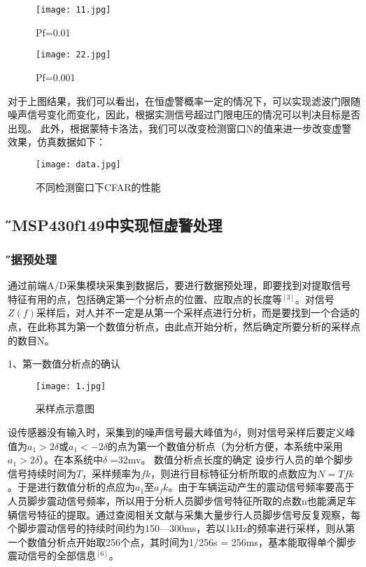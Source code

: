 \documentclass[12pt,a4paper]{article} %
\begin{document}
		
		
		\begin{figure}[h]
\begin{minipage}[bp]{0.5\linewidth}
\centering
\texttt{[image: 11.jpg]}
\caption{Pf=0.01}
\label{fig:side:a}
\end{minipage}
\begin{minipage}[bp]{0.5\linewidth}
\centering
\texttt{[image: 22.jpg]}
\caption{Pf=0.001}
\label{fig:side:b}
\end{minipage}
\end{figure}
  	
  	对于上图结果，我们可以看出，在恒虚警概率一定的情况下，可以实现滤波门限随噪声信号变化而变化，因此，根据实测信号超过门限电压的情况可以判决目标是否出现。
  	此外，根据蒙特卡洛法，我们可以改变检测窗口N的值来进一步改变虚警效果，仿真数据如下：
  	\begin{figure}[h] %
  	 \caption{不同检测窗口下CFAR的性能}
 		  \centering
 		  \texttt{[image: data.jpg]} 
  		 \label{fig:1.1.1}
		\end{figure}
  	
  	\subsection{\H 在MSP430f149中实现恒虚警处理 }
  		\subsubsection{\H 数据预处理 }
  		通过前端A/D采集模块采集到数据后，要进行数据预处理，即要找到对提取信号特征有用的点，包括确定第一个分析点的位置、应取点的长度等$^{[3]}$。对信号$Z(f)$采样后，对人并不一定是从第一个采样点进行分析，而是要找到一个合适的点，在此称其为第一个数值分析点，由此点开始分析，然后确定所要分析的采样点的数目N。
\par 1、第一数值分析点的确认
\begin{figure}[h] %
 		  \centering
 		  \texttt{[image: 1.jpg]} 
  		  \caption{采样点示意图}
  		 \label{fig:1.1.1}
		\end{figure}

  	设传感器没有输入时，采集到的噪声信号最大峰值为$\delta $，则对信号采样后要定义峰值为$a_1>2\delta $或$a_1<-2\delta $的点为第一个数值分析点（为分析方便，本系统中采用$a_1>2\delta$）。在本系统中$ \delta$ =32mv。
数值分析点长度的确定
设步行人员的单个脚步信号持续时间为$T$，采样频率为$fk$，则进行目标特征分析所取的点数应为$N=T fk$。于是进行数值分析的点应为$a_1$至$a_fk$。由于车辆运动产生的震动信号频率要高于人员脚步震动信号频率，所以用于分析人员脚步信号特征所取的点数n也能满足车辆信号特征的提取。通过查阅相关文献与采集大量步行人员脚步信号反复观察，每个脚步震动信号的持续时间约为150---300ms，若以1kHz的频率进行采样，则从第一个数值分析点开始取256个点，其时间为1/256s = 256ms，基本能取得单个脚步震动信号的全部信息$^{[6]}$。
\end{document}
